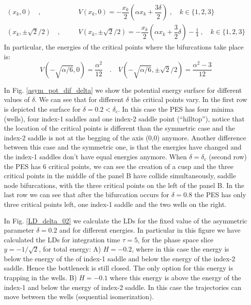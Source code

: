 \documentclass[10pt,aps,onecolumn,superscriptaddress]{revtex4-2}
\begin{document}
	\begin{eqnarray}
	(x_k,0) \quad ,& \quad  &V(x_k,0) = -\dfrac{x_k}{2} \left(\alpha x_k + \dfrac{3\delta}{2}\right) \;,\quad k \in \lbrace 1,2,3 \rbrace \\[.2cm]
	\left(x_k,\pm \sqrt{2}/2\right) \quad ,& \quad &V(x_k,\pm \sqrt{2}/2) = -\dfrac{x_k}{2} \left(\alpha x_k + \dfrac{3}{2}\delta \right) - \frac{1}{4} \;,\quad k \in \lbrace 1,2,3 \rbrace
	\end{eqnarray}
	In particular, the energies of the critical points where the bifurcations take place is:
	\begin{equation}\label{energyeq}
	V(-\sqrt{\alpha/6},0) = \frac{\alpha^2}{12} \quad.\quad V(-\sqrt{\alpha/6},\pm \sqrt{2}/2) = \frac{\alpha^2-3}{12}
	\end{equation}

In Fig. \ref{asym_pot_dif_delta} we show the potential energy surface for different values of $\delta$. We can see that for different $\delta$ the critical points vary. In the first row is depicted the surface for $\delta = 0.2 < \delta_{c}$. In this case the PES has four minima (wells), four index-1 saddles and one index-2 saddle point (``hilltop''), notice that the location of the critical points is different than the symmetric case and the index-2 saddle is not at the begging of the axis (0,0) anymore. Another difference between this case and the symmetric one, is that the energies have changed and the index-1 saddles don't have equal energies anymore. When $\delta = \delta_{c}$ (second row) the PES has 6 critical points, we can see the creation of a cusp and the three critical points in the middle of the panel B have collide simultaneously, saddle node bifurcations, with the three critical points on the left of the panel B. In the last row we can see that after the bifurcation occurs for $\delta = 0.8$ the PES has only three critical points left, one index-1 saddle and the two wells on the right.

In Fig. \ref{LD_delta_02} we calculate the LDs for the fixed value of the asymmetric parameter $\delta = 0.2$ and for different energies. In particular in this figure we have calculated the LDs for integration time $\tau = 5$, for  the phase space slice $y = -1/\sqrt{2}$, for total energy: A) $H = -0.2$, where in this case the energy is below the energy of the of index-1 saddle and below the energy of the index-2 saddle. Hence the bottleneck is still closed. The only option for this energy is trapping in the wells. B) $H=-0.1$ where this energy is above the energy of the index-1 and below the energy of index-2 saddle. In this case the trajectories can move between the wells (sequential isomerization).
\end{document}
